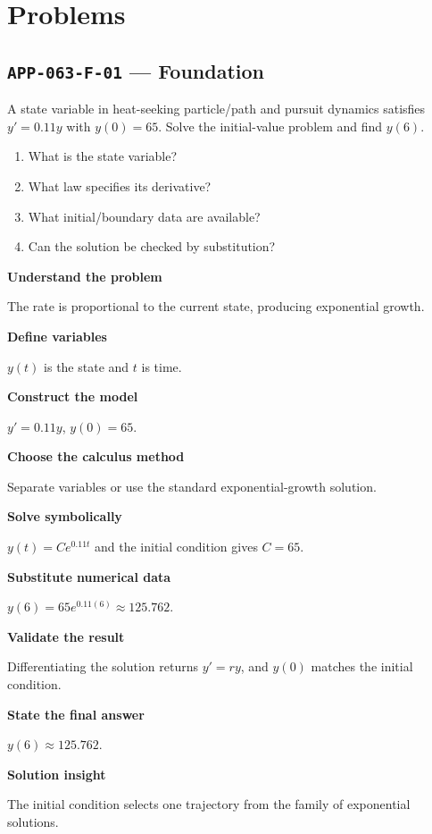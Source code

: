 \documentclass[11pt]{book}
\newcommand{\pid}[1]{\texttt{#1}}
\begin{document}
\section*{Problems}
\subsection*{\pid{APP-063-F-01} — Foundation}
\begin{problembox}
A state variable in heat-seeking particle/path and pursuit dynamics satisfies $y'=0.11y$ with $y(0)=65$. Solve the initial-value problem and find $y(6)$.
\end{problembox}
\begin{promptbox}\begin{enumerate}
\item What is the state variable?
\item What law specifies its derivative?
\item What initial/boundary data are available?
\item Can the solution be checked by substitution?
\end{enumerate}\end{promptbox}
\begin{solutionbox}
\textbf{Understand the problem}\par The rate is proportional to the current state, producing exponential growth.\par\medskip
\textbf{Define variables}\par $y(t)$ is the state and $t$ is time.\par\medskip
\textbf{Construct the model}\par $y'=0.11y$, $y(0)=65$.\par\medskip
\textbf{Choose the calculus method}\par Separate variables or use the standard exponential-growth solution.\par\medskip
\textbf{Solve symbolically}\par $y(t)=Ce^{0.11t}$ and the initial condition gives $C=65$.\par\medskip
\textbf{Substitute numerical data}\par $y(6)=65e^{0.11(6)}\approx 125.762$.\par\medskip
\textbf{Validate the result}\par Differentiating the solution returns $y'=ry$, and $y(0)$ matches the initial condition.\par\medskip
\textbf{State the final answer}\par $y(6)\approx 125.762$.\par\medskip
\textbf{Solution insight}\par The initial condition selects one trajectory from the family of exponential solutions.\par\medskip
\end{solutionbox}
\end{document}
